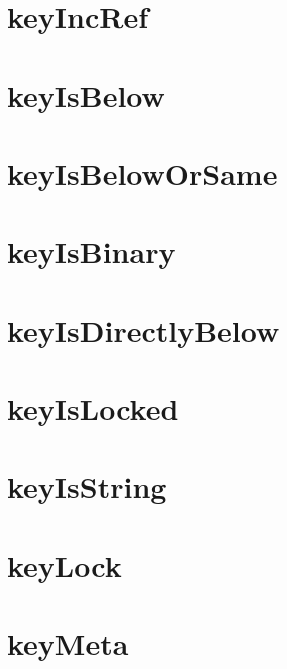\let\mypdfximage\pdfximage\def\pdfximage{\immediate\mypdfximage}\documentclass[twoside]{book}
\newcommand{\+}{\discretionary{\mbox{\scriptsize$\hookleftarrow$}}{}{}}
\begin{document}
\chapter{key\+Inc\+Ref}
\label{doc_api_review_core_keyIncRef_md}

\chapter{key\+Is\+Below}
\label{doc_api_review_core_keyIsBelow_md}

\chapter{key\+Is\+Below\+Or\+Same}
\label{doc_api_review_core_keyIsBelowOrSame_md}

\chapter{key\+Is\+Binary}
\label{doc_api_review_core_keyIsBinary_md}

\chapter{key\+Is\+Directly\+Below}
\label{doc_api_review_core_keyIsDirectlyBelow_md}

\chapter{key\+Is\+Locked}
\label{doc_api_review_core_keyIsLocked_md}

\chapter{key\+Is\+String}
\label{doc_api_review_core_keyIsString_md}

\chapter{key\+Lock}
\label{doc_api_review_core_keyLock_md}

\chapter{key\+Meta}
\label{doc_api_review_core_keyMeta_md}

\end{document}
